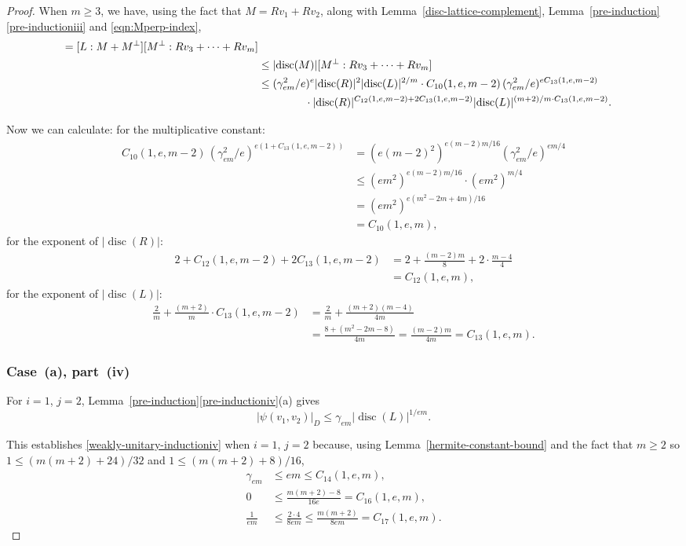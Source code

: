\documentclass[JEP,XML,SOM,Unicode,NoFloatCountersInSection]{cedram}
\DeclareMathOperator{\disc}{disc}
\newcommand{\abs}[1]{\lvert #1 \rvert}
\begin{document}
\begin{proof}
When $m \geq 3$, we have, using the fact that $M = Rv_1 + Rv_2$, along with Lemma~\ref{disc-lattice-complement}, Lemma~\ref{pre-induction}\eqref{pre-inductioniii} and \eqref{eqn:Mperp-index},
\begin{align*}
[L : Rv_1 &+ \dotsb + Rv_m]
= [L : M + M^\perp] [M^\perp : Rv_3 + \dotsb + Rv_m]
\\& \leq \abs{\disc(M)} [M^\perp : Rv_3 + \dotsb + Rv_m]
\\& \leq (\gamma_{em}^2/e)^{e} \abs{\disc(R)}^2 \abs{\disc(L)}^{2/m}
\cdot C_{10}(1,e,m-2) \, (\gamma_{em}^2/e)^{eC_{13}(1,e,m-2)}
\\& \hspace*{1.5cm} \cdot \abs{\disc(R)}^{C_{12}(1,e,m-2) + 2C_{13}(1,e,m-2)} \abs{\disc(L)}^{(m+2)/m \cdot C_{13}(1,e,m-2)}.
\end{align*}

Now we can calculate:
for the multiplicative constant:
\begin{align*}
C_{10}(1,e,m-2) \, (\gamma_{em}^2/e)^{e(1+C_{13}(1,e,m-2))}
& = (e(m-2)^2)^{e(m-2)m/16} (\gamma_{em}^2/e)^{em/4}
\\& \leq (em^2)^{e(m-2)m/16} \cdot (em^2)^{m/4}
\\& = (em^2)^{e(m^2-2m + 4m)/16}
\\& = C_{10}(1,e,m),
\end{align*}
for the exponent of $\abs{\disc(R)}$:
\begin{align*}
2 + C_{12}(1,e,m-2) + 2C_{13}(1,e,m-2)
& = 2 + \frac{(m-2)m}{8} + 2 \cdot \frac{m-4}{4}
\\& = C_{12}(1,e,m),
\end{align*}
for the exponent of $\abs{\disc(L)}$:
\begin{align*}
\frac{2}{m} + \frac{(m+2)}{m} \cdot C_{13}(1,e,m-2)
& = \frac{2}{m} + \frac{(m+2)(m-4)}{4m}
\\& = \frac{8+(m^2-2m-8)}{4m} = \frac{(m-2)m}{4m} = C_{13}(1,e,m).
\end{align*}

\subsubsection*{Case~(a), part~(iv)}
For $i=1$, $j=2$, Lemma~\ref{pre-induction}\eqref{pre-inductioniv}(a) gives
\begin{equation} \label{eqn:case-a-iv-base}
\abs{\psi(v_1, v_2)}_D \leq \gamma_{em} \abs{\disc(L)}^{1/em}.
\end{equation}

This establishes \eqref{weakly-unitary-inductioniv} when $i=1$, $j=2$ because,
using Lemma~\ref{hermite-constant-bound} and the fact that $m \geq 2$ so $1 \leq (m(m+2)+24)/32$ and $1 \leq (m(m+2)+8)/16$,
\begin{align*}
\gamma_{em} & \leq em \leq C_{14}(1,e,m),
\\ 0 & \leq \frac{m(m+2)-8}{16e} = C_{16}(1,e,m),
\\ \frac{1}{em} & \leq \frac{2 \cdot 4}{8em} \leq \frac{m(m+2)}{8em} = C_{17}(1,e,m).
\end{align*}


\end{proof}
\end{document}
